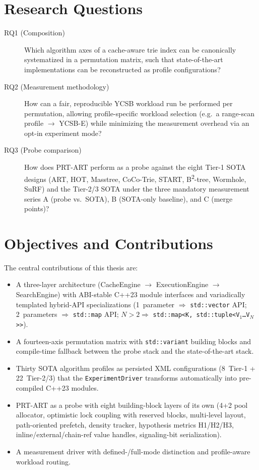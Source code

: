 \section{Research Questions}\label{sec:rqs}

\begin{description}
  \item[RQ1 (Composition)] Which algorithm axes of a cache-aware trie index can
        be canonically systematized in a permutation matrix, such that
        state-of-the-art implementations can be reconstructed as profile
        configurations?
  \item[RQ2 (Measurement methodology)] How can a fair, reproducible YCSB workload
        run be performed per permutation, allowing profile-specific workload
        selection (e.g.\ a range-scan profile $\to$ YCSB-E) while minimizing the
        measurement overhead via an opt-in experiment mode?
  \item[RQ3 (Probe comparison)] How does PRT-ART perform as a probe against the
        eight Tier-1 SOTA designs (ART, HOT, Masstree, CoCo-Trie, START,
        B\textsuperscript{2}-tree, Wormhole, SuRF) and the Tier-2/3 SOTA under the
        three mandatory measurement series A (probe vs.\ SOTA), B (SOTA-only
        baseline), and C (merge points)?
\end{description}

\section{Objectives and Contributions}\label{sec:contributions}

The central contributions of this thesis are:

\begin{itemize}
  \item A three-layer architecture (CacheEngine $\to$ ExecutionEngine $\to$
        SearchEngine) with ABI-stable C++23 module interfaces and variadically
        templated hybrid-API specializations (1~parameter $\Rightarrow$
        \texttt{std::vector} API; 2~parameters $\Rightarrow$ \texttt{std::map}
        API; $N>2 \Rightarrow$ \texttt{std::map<K, std::tuple<V$_1$\ldots V$_N$>>}).
  \item A fourteen-axis permutation matrix with \texttt{std::variant} building
        blocks and compile-time fallback between the probe stack and the
        state-of-the-art stack.
  \item Thirty SOTA algorithm profiles as persisted XML configurations (8~Tier-1
        + 22~Tier-2/3) that the \texttt{ExperimentDriver} transforms automatically
        into pre-compiled C++23 modules.
  \item PRT-ART as a probe with eight building-block layers of its own (4+2 pool
        allocator, optimistic lock coupling with reserved blocks, multi-level
        layout, path-oriented prefetch, density tracker, hypothesis metrics
        H1/H2/H3, inline/external/chain-ref value handles, signaling-bit
        serialization).
  \item A measurement driver with defined-/full-mode distinction and
        profile-aware workload routing.
\end{itemize}

